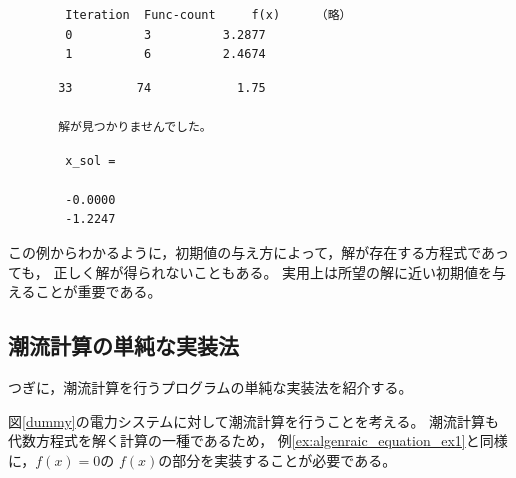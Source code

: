\documentclass[tombow,dvipdfmx]{corona-a5-1.1}
\begin{document}
{\begin{例}[代数方程式の解の探索]
\smallskip
\begin{実行結果}
    \begin{verbatim}
        Iteration  Func-count     f(x)     （略）
        0          3          3.2877
        1          6          2.4674
\end{verbatim}
    \omitcode
    \begin{verbatim}
       33         74            1.75       

       解が見つかりませんでした。
    \end{verbatim}
    \omitcode
    \begin{verbatim}
        x_sol =

        -0.0000
        -1.2247
    \end{verbatim}
\end{実行結果}

この例からわかるように，初期値の与え方によって，解が存在する方程式であっても，
正しく解が得られないこともある。
実用上は所望の解に近い初期値を与えることが重要である。
\end{例}

\subsection{潮流計算の単純な実装法}

つぎに，潮流計算を行うプログラムの単純な実装法を紹介する。
\begin{例}[潮流計算の実装法]\label{ex:simplepowerflow}
図\ref{dummy}の電力システムに対して潮流計算を行うことを考える。
潮流計算も代数方程式を解く計算の一種であるため，
例\nobreak\ref{ex:algenraic_equation_ex1}と同様に，$f(x)=0$の
$f(x)$の部分を実装することが必要である。


\end{例}}
\end{document}
